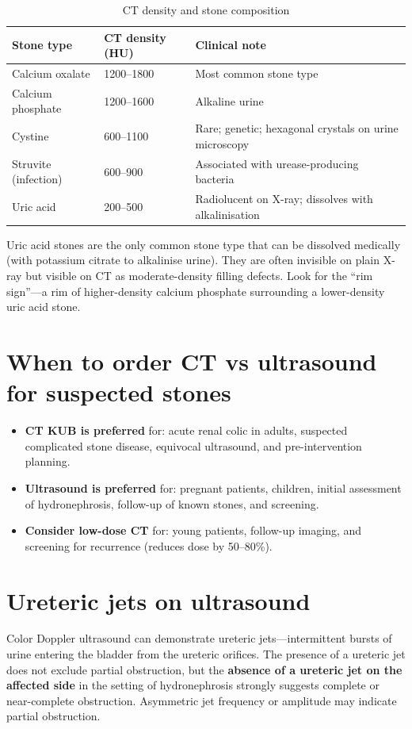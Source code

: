 \begin{table}[h]
\centering
\caption{CT density and stone composition}
\label{tab:stone_density}
\begin{tabular}{@{}p{}p{}p{}@{}}
\hline
\textbf{Stone type} & \textbf{CT density (HU)} & \textbf{Clinical note} \\
\hline
Calcium oxalate & 1200--1800 & Most common stone type \\
Calcium phosphate & 1200--1600 & Alkaline urine \\
Cystine & 600--1100 & Rare; genetic; hexagonal crystals on urine microscopy \\
Struvite (infection) & 600--900 & Associated with urease-producing bacteria \\
Uric acid & 200--500 & Radiolucent on X-ray; dissolves with alkalinisation \\
\hline
\end{tabular}
\end{table}

\begin{pearlbox}
Uric acid stones are the only common stone type that can be dissolved medically (with potassium citrate to alkalinise urine). They are often invisible on plain X-ray but visible on CT as moderate-density filling defects. Look for the ``rim sign''---a rim of higher-density calcium phosphate surrounding a lower-density uric acid stone.
\end{pearlbox}

\section{When to order CT vs ultrasound for suspected stones}
\begin{itemize}
    \item \textbf{CT KUB is preferred} for: acute renal colic in adults, suspected complicated stone disease, equivocal ultrasound, and pre-intervention planning.
    \item \textbf{Ultrasound is preferred} for: pregnant patients, children, initial assessment of hydronephrosis, follow-up of known stones, and screening.
    \item \textbf{Consider low-dose CT} for: young patients, follow-up imaging, and screening for recurrence (reduces dose by 50--80\%).
\end{itemize}

\section{Ureteric jets on ultrasound}
Color Doppler ultrasound can demonstrate ureteric jets---intermittent bursts of urine entering the bladder from the ureteric orifices. The presence of a ureteric jet does not exclude partial obstruction, but the \textbf{absence of a ureteric jet on the affected side} in the setting of hydronephrosis strongly suggests complete or near-complete obstruction. Asymmetric jet frequency or amplitude may indicate partial obstruction.

